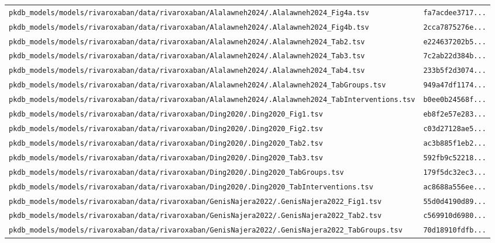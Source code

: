 \documentclass{article}
\begin{document}
\begin{longtable}{ll}
\texttt{pkdb\_models/models/rivaroxaban/data/rivaroxaban/Alalawneh2024/.Alalawneh2024\_Fig4a.tsv} & \texttt{fa7acdee3717...} \\
\texttt{pkdb\_models/models/rivaroxaban/data/rivaroxaban/Alalawneh2024/.Alalawneh2024\_Fig4b.tsv} & \texttt{2cca7875276e...} \\
\texttt{pkdb\_models/models/rivaroxaban/data/rivaroxaban/Alalawneh2024/.Alalawneh2024\_Tab2.tsv} & \texttt{e224637202b5...} \\
\texttt{pkdb\_models/models/rivaroxaban/data/rivaroxaban/Alalawneh2024/.Alalawneh2024\_Tab3.tsv} & \texttt{7c2ab22d384b...} \\
\texttt{pkdb\_models/models/rivaroxaban/data/rivaroxaban/Alalawneh2024/.Alalawneh2024\_Tab4.tsv} & \texttt{233b5f2d3074...} \\
\texttt{pkdb\_models/models/rivaroxaban/data/rivaroxaban/Alalawneh2024/.Alalawneh2024\_TabGroups.tsv} & \texttt{949a47df1174...} \\
\texttt{pkdb\_models/models/rivaroxaban/data/rivaroxaban/Alalawneh2024/.Alalawneh2024\_TabInterventions.tsv} & \texttt{b0ee0b24568f...} \\
\texttt{pkdb\_models/models/rivaroxaban/data/rivaroxaban/Ding2020/.Ding2020\_Fig1.tsv} & \texttt{eb8f2e57e283...} \\
\texttt{pkdb\_models/models/rivaroxaban/data/rivaroxaban/Ding2020/.Ding2020\_Fig2.tsv} & \texttt{c03d27128ae5...} \\
\texttt{pkdb\_models/models/rivaroxaban/data/rivaroxaban/Ding2020/.Ding2020\_Tab2.tsv} & \texttt{ac3b885f1eb2...} \\
\texttt{pkdb\_models/models/rivaroxaban/data/rivaroxaban/Ding2020/.Ding2020\_Tab3.tsv} & \texttt{592fb9c52218...} \\
\texttt{pkdb\_models/models/rivaroxaban/data/rivaroxaban/Ding2020/.Ding2020\_TabGroups.tsv} & \texttt{179f5dc32ec3...} \\
\texttt{pkdb\_models/models/rivaroxaban/data/rivaroxaban/Ding2020/.Ding2020\_TabInterventions.tsv} & \texttt{ac8688a556ee...} \\
\texttt{pkdb\_models/models/rivaroxaban/data/rivaroxaban/GenisNajera2022/.GenisNajera2022\_Fig1.tsv} & \texttt{55d0d4190d89...} \\
\texttt{pkdb\_models/models/rivaroxaban/data/rivaroxaban/GenisNajera2022/.GenisNajera2022\_Tab2.tsv} & \texttt{c569910d6980...} \\
\texttt{pkdb\_models/models/rivaroxaban/data/rivaroxaban/GenisNajera2022/.GenisNajera2022\_TabGroups.tsv} & \texttt{70d18910fdfb...} \\

\end{longtable}
\end{document}
